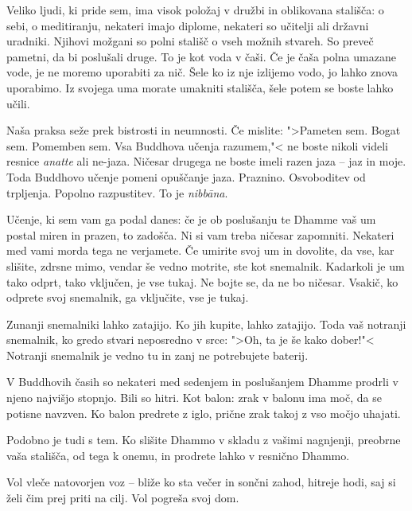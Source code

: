 
Veliko ljudi, ki pride sem, ima visok položaj v družbi in oblikovana stališča: o sebi, o meditiranju, nekateri imajo diplome, nekateri so učitelji ali državni uradniki. Njihovi možgani so polni stališč o vseh možnih stvareh. So preveč pametni, da bi poslušali druge. To je kot voda v čaši. Če je čaša polna umazane vode, je ne moremo uporabiti za nič. Šele ko iz nje izlijemo vodo, jo lahko znova uporabimo. Iz svojega uma morate umakniti stališča, šele potem se boste lahko učili.

Naša praksa seže prek bistrosti in neumnosti. Če mislite: ">Pameten sem. Bogat sem. Pomemben sem. Vsa Buddhova učenja razumem,"< ne boste nikoli videli resnice \emph{anatte} ali ne-jaza. Ničesar drugega ne boste imeli razen jaza – jaz in moje. Toda Buddhovo učenje pomeni opuščanje jaza. Praznino. Osvoboditev od trpljenja. Popolno razpustitev. To je \emph{nibbāna}.

\clearpage


Učenje, ki sem vam ga podal danes: če je ob poslušanju te Dhamme vaš um postal miren in prazen, to zadošča. Ni si vam treba ničesar zapomniti. Nekateri med vami morda tega ne verjamete. Če umirite svoj um in dovolite, da vse, kar slišite, zdrsne mimo, vendar še vedno motrite, ste kot snemalnik. Kadarkoli je um tako odprt, tako vključen, je vse tukaj. Ne bojte se, da ne bo ničesar. Vsakič, ko odprete svoj snemalnik, ga vključite, vse je tukaj.

Zunanji snemalniki lahko zatajijo. Ko jih kupite, lahko zatajijo. Toda vaš notranji snemalnik, ko gredo stvari neposredno v srce: ">Oh, ta je še kako dober!"< Notranji snemalnik je vedno tu in zanj ne potrebujete baterij.

\clearpage


V Buddhovih časih so nekateri med sedenjem in poslušanjem Dhamme prodrli v njeno najvišjo stopnjo. Bili so hitri. Kot balon: zrak v balonu ima moč, da se potisne navzven. Ko balon predrete z iglo, prične zrak takoj z vso močjo uhajati.

Podobno je tudi s tem. Ko slišite Dhammo v skladu z vašimi nagnjenji, preobrne vaša stališča, od tega k onemu, in prodrete lahko v resnično Dhammo.


Vol vleče natovorjen voz – bliže ko sta večer in sončni zahod, hitreje hodi, saj si želi čim prej priti na cilj. Vol pogreša svoj dom.

